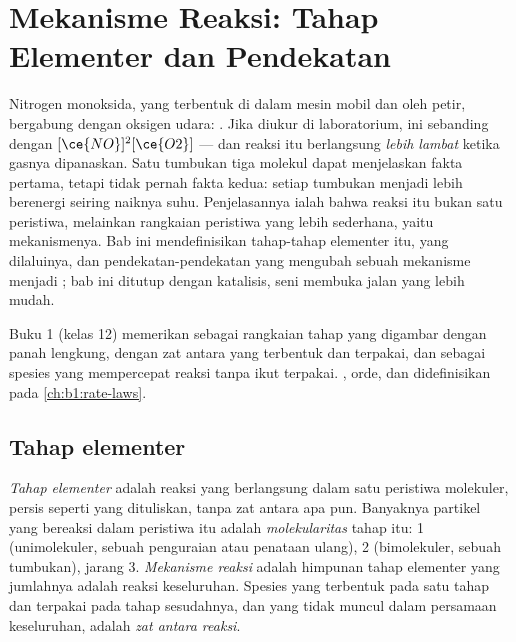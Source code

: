 \chapter{Mekanisme Reaksi: Tahap Elementer dan Pendekatan}\label{ch:b1:elementary-steps}

Nitrogen monoksida, yang terbentuk di dalam mesin mobil dan oleh petir,
bergabung dengan oksigen udara: . Jika diukur di
laboratorium,  ini sebanding dengan $[\ce{NO}]^2[\ce{O2}]$ ---
dan reaksi itu berlangsung \emph{lebih lambat} ketika gasnya dipanaskan.
Satu tumbukan tiga molekul dapat menjelaskan fakta pertama, tetapi tidak
pernah fakta kedua: setiap tumbukan menjadi lebih berenergi seiring
naiknya suhu. Penjelasannya ialah bahwa reaksi itu bukan satu peristiwa,
melainkan rangkaian peristiwa yang lebih sederhana, yaitu mekanismenya.
Bab ini mendefinisikan tahap-tahap elementer itu,  yang
dilaluinya, dan pendekatan-pendekatan yang mengubah sebuah mekanisme
menjadi ; bab ini ditutup dengan katalisis, seni membuka jalan
yang lebih mudah.

\begin{recall}
Buku 1 (kelas 12) memerikan  sebagai rangkaian tahap yang
digambar dengan panah lengkung, dengan zat antara yang terbentuk dan
terpakai, dan  sebagai spesies yang mempercepat reaksi tanpa ikut
terpakai. , orde, dan  didefinisikan pada
\cref{ch:b1:rate-laws}.
\end{recall}

\section{Tahap elementer}

\begin{definition}\label{def:b1:elementary-steps:elementary-step}
\emph{Tahap elementer} adalah reaksi yang
berlangsung dalam satu peristiwa molekuler, persis seperti yang
dituliskan, tanpa zat antara apa pun. Banyaknya partikel yang bereaksi
dalam peristiwa itu adalah \emph{molekularitas} tahap
itu: 1
(unimolekuler, sebuah penguraian atau penataan ulang), 2 (bimolekuler,
sebuah tumbukan), jarang 3.
\emph{Mekanisme reaksi} adalah himpunan tahap elementer yang jumlahnya adalah reaksi
keseluruhan. Spesies yang terbentuk pada satu tahap dan terpakai pada
tahap sesudahnya, dan yang tidak muncul dalam persamaan keseluruhan,
adalah \emph{zat antara reaksi}.
\end{definition}

